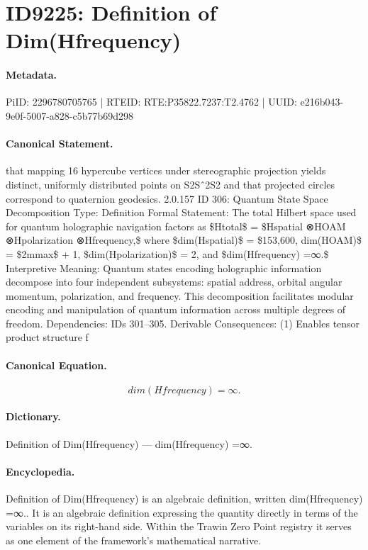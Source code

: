 \section*{ID9225: Definition of Dim(Hfrequency)}
\paragraph{Metadata.}
PiID: 2296780705765 | RTEID: RTE:P35822.7237:T2.4762 | UUID: e216b043-9e0f-5007-a828-c5b77b69d298

\paragraph{Canonical Statement.}
that mapping 16 hypercube vertices under stereographic projection yields distinct, uniformly distributed points on S2Sˆ2S2 and that projected circles correspond to quaternion geodesics. 2.0.157 ID 306: Quantum State Space Decomposition Type: Definition Formal Statement: The total Hilbert space used for quantum holographic navigation factors as \$Htotal\$ = \$Hspatial ⊗HOAM ⊗Hpolarization ⊗Hfrequency,\$ where \$dim(Hspatial)\$ = \$153,600, dim(HOAM)\$ = \$2mmax\$ + 1, \$dim(Hpolarization)\$ = 2, and \$dim(Hfrequency) =∞.\$ Interpretive Meaning: Quantum states encoding holographic information decompose into four independent subsystems: spatial address, orbital angular momentum, polarization, and frequency. This decomposition facilitates modular encoding and manipulation of quantum information across multiple degrees of freedom. Dependencies: IDs 301–305. Derivable Consequences: (1) Enables tensor product structure f

\paragraph{Canonical Equation.}
\[
dim(Hfrequency) =∞.
\]

\paragraph{Dictionary.}
Definition of Dim(Hfrequency) — dim(Hfrequency) =∞.

\paragraph{Encyclopedia.}
Definition of Dim(Hfrequency) is an algebraic definition, written dim(Hfrequency) =∞.. It is an algebraic definition expressing the quantity directly in terms of the variables on its right-hand side. Within the Trawin Zero Point registry it serves as one element of the framework's mathematical narrative.
